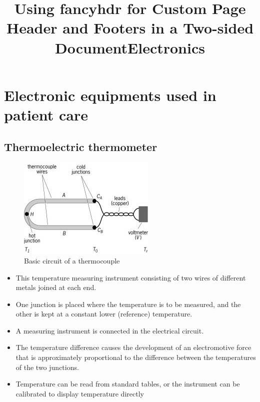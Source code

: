 \documentclass[12pt]{book}
\title{Using fancyhdr for Custom Page Header and Footers in a Two-sided Document}
\begin{document}
\setcounter{secnumdepth}{0}

\title{Electronics}
\maketitle
\tableofcontents
\newpage

\setcounter{page}{1}
\graphicspath{ {../} }
\chapter{Electronic equipments used in patient care}
\section{Thermoelectric thermometer}
\begin{figure}
    \centering
    \includegraphics[width=0.5\linewidth]{thermocouple.jpg}
    \caption{Basic circuit of a thermocouple}%
    \label{fig:}
\end{figure}
\begin{itemize}



    \item This temperature measuring instrument consisting of two wires of different
metals joined at each end.
\item One junction is placed where the temperature is to be measured, and the other is kept at a constant lower (reference) temperature.
\item A measuring instrument is connected in the electrical
circuit.
\item The temperature difference causes the development of an electromotive force that is approximately proportional to the difference between the temperatures of the two junctions.
\item Temperature can be read from standard tables, or the instrument can be calibrated to display temperature directly
\end{itemize}
\end{document}

